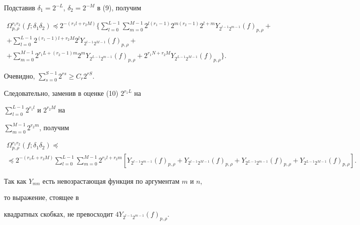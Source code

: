 Подставив $\delta_1=2^{-L}$, $\delta_2=2^{-M}$ в (9), получим 


\begin{multline} 


\Omega^{r_1r_2}_{p,\rho}(f;\delta_1\delta_2)\preceq 


2^{-(r_1l+r_2M)}\bigg\{\sum^{L-1}_{l=0}\sum^{M-1}_{m=0} 


2^{l(r_1-1)}2^{m(r_2-1)}2^{l+m}Y_{2^{l-1}2^{m-1}}(f)_{p,\rho}+\\ 


% 


+\sum^{L-1}_{l=0}2^{(r_1-1)l+r_2M}2^l 


Y_{2^{l-1}2^{M-1}}(f)_{p,\rho}+ \\ 


% 


+\sum^{M-1}_{m=0}2^{r_1L+(r_2-1)m}2^m 


Y_{2^{L-1}2^{m-1}}(f)_{p,\rho}+ 


2^{r_1N+r_2M}Y_{2^{L-1}2^{M-1}}(f)_{p,\rho}\bigg\}. 


\end{multline} 


Очевидно, $\sum\limits^{S-1}_{s=0}2^{r s}\ge C_r2^{r S}$. 


Следовательно, заменив в оценке (10) $2^{r_1L}$ на 


$\sum\limits^{L-1}_{l=0}2^{r_1l}$ и $2^{r_2M}$ на 


$\sum\limits^{M-1}_{m=0}2^{r_2m}$, получим 


\begin{multline*} 


\Omega^{r_1r_2}_{p,\rho}(f;\delta_1\delta_2)\preceq \\ 


\preceq 2^{-(r_1L+r_2M)}\sum^{L-1}_{l=0} 


\sum^{M-1}_{m=0}2^{r_1l+r_2m} 


[Y_{2^{l-1}2^{m-1}}(f)_{p,\rho}+ 


Y_{2^{l-1}2^{M-1}}(f)_{p,\rho}+ 


Y_{2^{L-1}2^{m-1}}(f)_{p,\rho}+ 


Y_{2^{L-1}2^{M-1}}(f)_{p,\rho}]. 


\end{multline*} 


Так как $Y_{m n}$ есть невозрастающая функция по аргументам $m$ и $n$, 


то выражение, стоящее в 


квадратных скобках, не превосходит $4Y_{2^{l-1}2^{m-1}}(f)_{p,\rho}$. 


